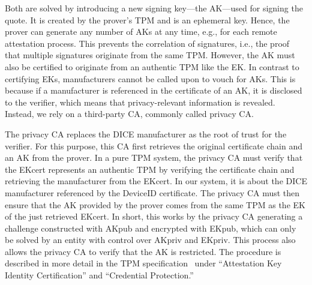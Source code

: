 
Both are solved by introducing a new signing key---the \ac{AK}---used for signing the quote.
It is created by the prover's TPM and is an ephemeral key.
Hence, the prover can generate any number of \acp{AK} at any time, e.g., for each remote attestation process.
This prevents the correlation of signatures, i.e., the proof that multiple signatures originate from the same TPM\@.
However, the AK must also be certified to originate from an authentic TPM like the EK\@.
In contrast to certifying \acp{EK}, manufacturers cannot be called upon to vouch for \acp{AK}.
This is because if a manufacturer is referenced in the certificate of an AK, it is disclosed to the verifier, which means that privacy-relevant information is revealed.
Instead, we rely on a third-party \ac{CA}, commonly called privacy \ac{CA}\@.

The privacy \ac{CA} replaces the DICE manufacturer as the root of trust for the verifier.
For this purpose, this \ac{CA} first retrieves the original certificate chain and an AK from the prover.
In a pure TPM system, the privacy \ac{CA} must verify that the EKcert represents an authentic TPM by verifying the certificate chain and retrieving the manufacturer from the EKcert.
In our system, it is about the DICE manufacturer referenced by the DeviceID certificate.
The privacy \ac{CA} must then ensure that the AK provided by the prover comes from the same TPM as the EK of the just retrieved EKcert.
In short, this works by the privacy \ac{CA} generating a challenge constructed with AKpub and encrypted with EKpub, which can only be solved by an entity with control over AKpriv and EKpriv\@.
This process also allows the privacy \ac{CA} to verify that the AK is restricted.
The procedure is described in more detail in the TPM specification~\cite{tpm20} under ``Attestation Key Identity Certification'' and ``Credential Protection.''


